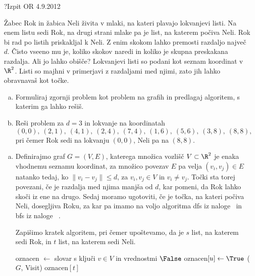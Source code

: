 \begin{naloga}{?}{Izpit OR 4.9.2012}
\begin{vprasanje}
Žabec Rok in žabica Neli živita v mlaki,
na kateri plavajo lokvanjevi listi.
Na enem listu sedi Rok,
na drugi strani mlake pa je list, na katerem počiva Neli.
Rok bi rad po listih priskakljal k Neli.
Z enim skokom lahko premosti razdaljo največ $d$.
Čisto vseeno mu je, koliko skokov naredi
in koliko je skupna preskakana razdalja.
Ali jo lahko obišče?
Lokvanjevi listi so podani kot seznam koordinat v $\R^2$.
Listi so majhni v primerjavi z razdaljami med njimi,
zato jih lahko obravnavaš kot točke.

\begin{enumerate}[(a)]
\item Formuliraj zgornji problem kot problem na grafih in predlagaj algoritem,
s katerim ga lahko rešiš.

\item Reši problem za $d = 3$ in lokvanje na koordinatah
$$
(0, 0), \ (2, 1), \ (4, 1), \ (2, 4), \ (7, 4),
\ (1, 6), \ (5, 6), \ (3, 8), \ (8, 8),
$$
pri čemer Rok sedi na lokvanju $(0, 0)$, Neli pa na $(8, 8)$.
\end{enumerate}
\end{vprasanje}

\begin{odgovor}
\begin{enumerate}[(a)]
\item Definirajmo graf $G = (V, E)$, katerega množica vozlišč $V \subset \R^2$ je enaka vhodnemu seznamu koordinat, 
za množico povezav $E$ pa velja $(v_i, v_j) \in E$ natanko tedaj, ko $\|v_i - v_j\|  \leq d$, za $v_i, v_j \in V$ in $v_i \neq v_j$.
Točki sta torej povezani, če je razdalja med njima manjša od $d$, kar pomeni, da Rok lahko skoči iz ene na drugo.
Sedaj moramo ugotoviti, če je točka, na kateri počiva Neli, dosegljiva Roku, 
za kar pa imamo na voljo algoritma {\sc dfs} iz naloge ~\nal[dfs] in {\sc bfs} iz naloge ~\nal[bfs].

Zapišimo kratek algoritem, pri čemer upoštevamo, da je $s$ list, na katerem sedi Rok, in $t$ list, na katerem sedi Neli.
\begin{small}
\begin{algorithmic}
	\State oznacen $\gets$ slovar s ključi $v \in V$ in vrednostmi $\False$
		\State oznacen$[u] \gets \True$
	\EndFunction
	($G$, {\sc Visit})
	\State \Return oznacen$[t]$
\EndFunction
\end{algorithmic}
\end{small}


\end{enumerate}
\end{odgovor}
\end{naloga}
